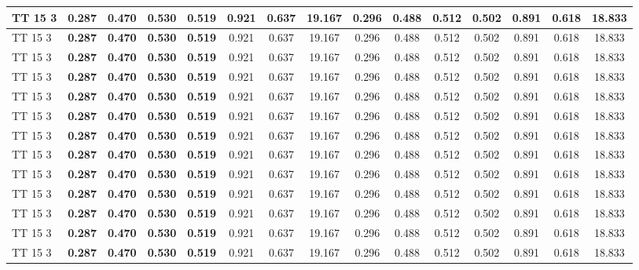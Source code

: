 \documentclass{article}
\begin{document}
\begin{longtable}[c]{|l|c|c|c|c|c|c|c||c|c|c|c|c|c|c|}
TT 15  3 & \textbf{0.287} & \textbf{0.470} & \textbf{0.530} & \textbf{0.519} & 0.921 & 0.637 & 19.167 & 0.296 & 0.488 & 0.512 & 0.502 & 0.891 & 0.618 & 18.833\\ \hline
TT 15  3 & \textbf{0.287} & \textbf{0.470} & \textbf{0.530} & \textbf{0.519} & 0.921 & 0.637 & 19.167 & 0.296 & 0.488 & 0.512 & 0.502 & 0.891 & 0.618 & 18.833\\ \hline
TT 15  3 & \textbf{0.287} & \textbf{0.470} & \textbf{0.530} & \textbf{0.519} & 0.921 & 0.637 & 19.167 & 0.296 & 0.488 & 0.512 & 0.502 & 0.891 & 0.618 & 18.833\\ \hline
TT 15  3 & \textbf{0.287} & \textbf{0.470} & \textbf{0.530} & \textbf{0.519} & 0.921 & 0.637 & 19.167 & 0.296 & 0.488 & 0.512 & 0.502 & 0.891 & 0.618 & 18.833\\ \hline
TT 15  3 & \textbf{0.287} & \textbf{0.470} & \textbf{0.530} & \textbf{0.519} & 0.921 & 0.637 & 19.167 & 0.296 & 0.488 & 0.512 & 0.502 & 0.891 & 0.618 & 18.833\\ \hline
TT 15  3 & \textbf{0.287} & \textbf{0.470} & \textbf{0.530} & \textbf{0.519} & 0.921 & 0.637 & 19.167 & 0.296 & 0.488 & 0.512 & 0.502 & 0.891 & 0.618 & 18.833\\ \hline
TT 15  3 & \textbf{0.287} & \textbf{0.470} & \textbf{0.530} & \textbf{0.519} & 0.921 & 0.637 & 19.167 & 0.296 & 0.488 & 0.512 & 0.502 & 0.891 & 0.618 & 18.833\\ \hline
TT 15  3 & \textbf{0.287} & \textbf{0.470} & \textbf{0.530} & \textbf{0.519} & 0.921 & 0.637 & 19.167 & 0.296 & 0.488 & 0.512 & 0.502 & 0.891 & 0.618 & 18.833\\ \hline
TT 15  3 & \textbf{0.287} & \textbf{0.470} & \textbf{0.530} & \textbf{0.519} & 0.921 & 0.637 & 19.167 & 0.296 & 0.488 & 0.512 & 0.502 & 0.891 & 0.618 & 18.833\\ \hline
TT 15  3 & \textbf{0.287} & \textbf{0.470} & \textbf{0.530} & \textbf{0.519} & 0.921 & 0.637 & 19.167 & 0.296 & 0.488 & 0.512 & 0.502 & 0.891 & 0.618 & 18.833\\ \hline
TT 15  3 & \textbf{0.287} & \textbf{0.470} & \textbf{0.530} & \textbf{0.519} & 0.921 & 0.637 & 19.167 & 0.296 & 0.488 & 0.512 & 0.502 & 0.891 & 0.618 & 18.833\\ \hline
TT 15  3 & \textbf{0.287} & \textbf{0.470} & \textbf{0.530} & \textbf{0.519} & 0.921 & 0.637 & 19.167 & 0.296 & 0.488 & 0.512 & 0.502 & 0.891 & 0.618 & 18.833\\ \hline
TT 15  3 & \textbf{0.287} & \textbf{0.470} & \textbf{0.530} & \textbf{0.519} & 0.921 & 0.637 & 19.167 & 0.296 & 0.488 & 0.512 & 0.502 & 0.891 & 0.618 & 18.833\\ \hline

\end{longtable}
\end{document}
